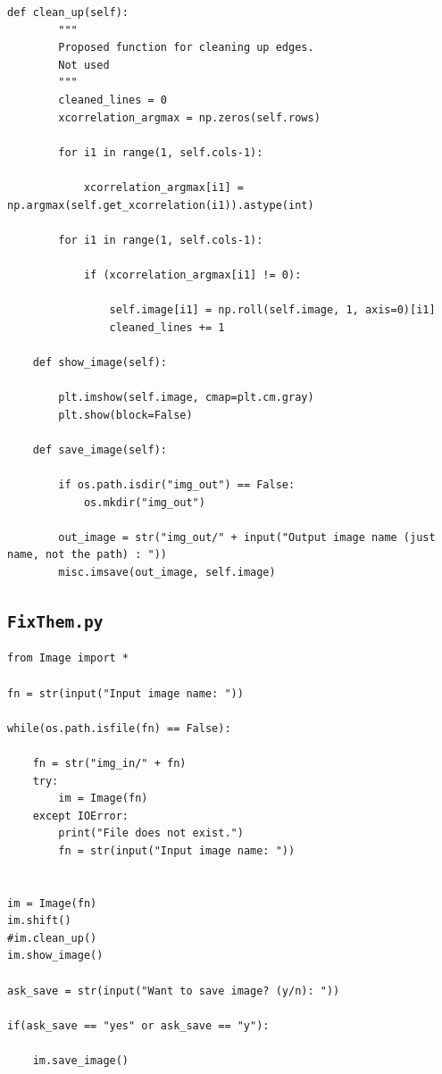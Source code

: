 \documentclass[a4paper,12pt]{article}
\begin{document}
\begin{lstlisting}[language=numpy]
    def clean_up(self):
        """
        Proposed function for cleaning up edges.
        Not used
        """
        cleaned_lines = 0
        xcorrelation_argmax = np.zeros(self.rows)

        for i1 in range(1, self.cols-1):

            xcorrelation_argmax[i1] = np.argmax(self.get_xcorrelation(i1)).astype(int)

        for i1 in range(1, self.cols-1):

            if (xcorrelation_argmax[i1] != 0):

                self.image[i1] = np.roll(self.image, 1, axis=0)[i1]
                cleaned_lines += 1

    def show_image(self):

        plt.imshow(self.image, cmap=plt.cm.gray)
        plt.show(block=False)

    def save_image(self):

        if os.path.isdir("img_out") == False:
            os.mkdir("img_out")

        out_image = str("img_out/" + input("Output image name (just name, not the path) : "))
        misc.imsave(out_image, self.image)
\end{lstlisting}

\subsection{\texttt{FixThem.py}}

\begin{lstlisting}[language=numpy]
from Image import *

fn = str(input("Input image name: "))

while(os.path.isfile(fn) == False):

    fn = str("img_in/" + fn)
    try:
        im = Image(fn)
    except IOError:
        print("File does not exist.")
        fn = str(input("Input image name: "))


im = Image(fn)
im.shift()
#im.clean_up()
im.show_image()

ask_save = str(input("Want to save image? (y/n): "))

if(ask_save == "yes" or ask_save == "y"):

    im.save_image()
\end{lstlisting}

\newpage



\end{document}
